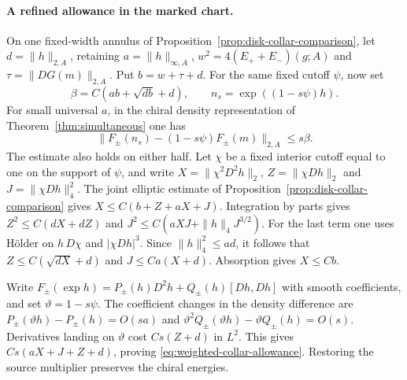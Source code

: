 \paragraph{A refined allowance in the marked chart.}
On one fixed-width annulus of
Proposition~\ref{prop:disk-collar-comparison}, let
\(d=\|h\|_{2,A}\), retaining \(a=\|h\|_{\infty,A}\),
\(w^2=4(E_++E_-)(g;A)\) and \(\tau=\|DG(m)\|_{2,A}\).
Put \(b=w+\tau+d\). For the same fixed cutoff \(\psi\), now set
\[
 \beta=C(ab+\sqrt{db}+d),\qquad
 n_s=\exp((1-s\psi)h).
\]
For small universal \(a\), in the chiral density representation of
Theorem~\ref{thm:simultaneous} one has
\begin{equation}\label{eq:weighted-collar-allowance}
 \|F_\pm(n_s)-(1-s\psi)F_\pm(m)\|_{2,A}\le s\beta .
\end{equation}
The estimate also holds on either half. Let \(\chi\) be a fixed
interior cutoff equal to one on the support of \(\psi\), and write
\(X=\|\chi^2 D^2h\|_2\), \(Z=\|\chi Dh\|_2\) and
\(J=\|\chi Dh\|_4^2\). The joint elliptic estimate of
Proposition~\ref{prop:disk-collar-comparison} gives
\(X\le C(b+Z+aX+J)\). Integration by parts gives
\(Z^2\le C(dX+dZ)\) and
\(J^2\le C(aXJ+\|h\|_4 J^{3/2})\). For the last term one uses
H\"older on \(h\,D\chi\) and \(|\chi Dh|^3\).
Since \(\|h\|_4^2\le ad\), it follows that
\(Z\le C(\sqrt{dX}+d)\) and \(J\le Ca(X+d)\).
Absorption gives \(X\le Cb\).

Write \(F_\pm(\exp h)=P_\pm(h)D^2h+Q_\pm(h)[Dh,Dh]\) with
smooth coefficients, and set \(\vartheta=1-s\psi\).
The coefficient changes in the density difference are
\(P_\pm(\vartheta h)-P_\pm(h)=O(sa)\) and
\(\vartheta^2Q_\pm(\vartheta h)-\vartheta Q_\pm(h)=O(s)\).
Derivatives landing on \(\vartheta\) cost \(Cs(Z+d)\) in
\(L^2\). This gives \(Cs(aX+J+Z+d)\), proving
\eqref{eq:weighted-collar-allowance}. Restoring the source multiplier
preserves the chiral energies.

